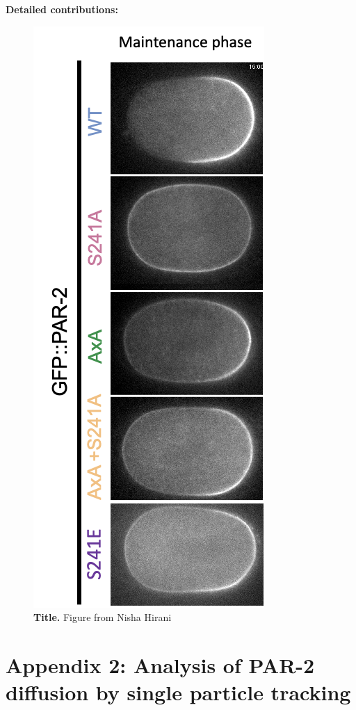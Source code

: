 \documentclass[12pt]{"report"}
\newcommand{\mycaption}[2]{\caption[#1]{\textbf{#1.} #2}}
\begin{document}
\textbf{Detailed contributions:}\\


\begin{figure}
\includegraphics[scale=0.4]{par2_phos_mutants}
\centering
\mycaption{Title}{Figure from Nisha Hirani}
\label{fig:par2_phos_mutants}
\end{figure}


\clearpage
\chapter*{Appendix 2: Analysis of PAR-2 diffusion by single particle tracking}
\end{document}
